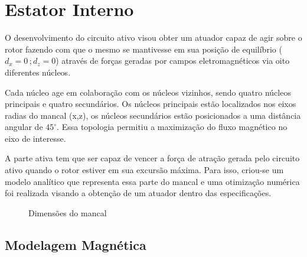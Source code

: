 \pagestyle{empty}

\pagestyle{fancy}

%




\chapter{Estator Interno}
%

O desenvolvimento do circuito ativo visou obter um atuador capaz de agir sobre o rotor fazendo com que o mesmo se mantivesse em sua posição de equilíbrio ($d_x = 0 \, ; d_z = 0$) através de forças geradas por campos eletromagnéticos via oito diferentes núcleos.

Cada núcleo age em colaboração com os núcleos vizinhos, sendo quatro núcleos principais e quatro secundários. Os núcleos principais estão localizados nos eixos radias do mancal (x,z), os núcleos secundários estão posicionados a uma distância angular de $45 ^\circ$. Essa topologia permitiu a maximização do fluxo magnético no eixo de interesse.

A parte ativa tem que ser capaz de vencer a força de atração gerada pelo circuito ativo quando o rotor estiver em sua excursão máxima. Para isso, criou-se um modelo analítico que representa essa parte do mancal e uma otimização numérica foi realizada visando a obtenção de um atuador dentro das especificações.

\begin{figure}[!ht]
	\centering
	\def\svgwidth{1\columnwidth}
	
	\caption{Dimensões do mancal}
	\label{Fig:modelagem:dim:ativo}
\end{figure}

\section{Modelagem Magnética}

